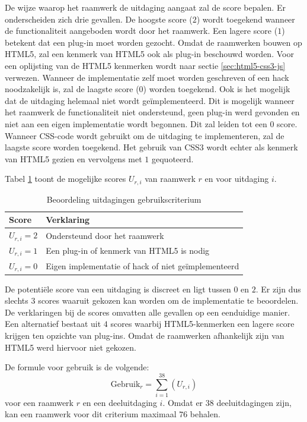 De wijze waarop het raamwerk de uitdaging aangaat zal de score bepalen.
Er onderscheiden zich drie gevallen.
De hoogste score ($2$) wordt toegekend wanneer de functionaliteit aangeboden wordt door het raamwerk. 
Een lagere score ($1$) betekent dat een plug-in moet worden gezocht.
Omdat de raamwerken bouwen op HTML5, zal een kenmerk van HTML5 ook als plug-in beschouwd worden.
Voor een oplijsting van de HTML5 kenmerken wordt naar sectie \ref{sec:html5-css3-js} verwezen.
Wanneer de implementatie zelf moet worden geschreven of een hack noodzakelijk is, zal de laagste score ($0$) worden toegekend.
Ook is het mogelijk  dat de uitdaging helemaal niet wordt geïmplementeerd.
Dit is mogelijk wanneer het raamwerk de functionaliteit niet ondersteund,  geen plug-in werd gevonden en niet aan een eigen implementatie wordt begonnen.
Dit zal leiden tot een $0$ score.
Wanneer CSS-code wordt gebruikt om de uitdaging te implementeren, zal de laagste score worden toegekend.
Het gebruik van CSS3 wordt echter als kenmerk van HTML5 gezien en vervolgens met $1$ gequoteerd.

Tabel \ref{tabel:scores-uitdagingen} toont de mogelijke scores $U_{r,i}$ van raamwerk $r$ en voor uitdaging $i$.
\begin{table}	
  \centering
  \begin{tabular}{ll}
    \toprule
    \textbf{Score} & \textbf{Verklaring}\\
    \midrule
    $U_{r,i} = 2$ & Ondersteund door het raamwerk\\
    $U_{r,i} = 1$ & Een plug-in of kenmerk van HTML5 is nodig\\
    $U_{r,i} = 0$ & Eigen implementatie of hack of niet geïmplementeerd\\ 
    \bottomrule
  \end{tabular}
  \caption{Beoordeling uitdagingen gebruikscriterium}
  \label{tabel:scores-uitdagingen}
\end{table}

De potentiële score van een uitdaging is discreet en ligt tussen $0$ en $2$.
Er zijn dus slechts $3$ scores waaruit gekozen kan worden om de implementatie te beoordelen.
De verklaringen bij de scores omvatten alle gevallen op een eenduidige manier.
Een alternatief bestaat uit $4$ scores waarbij HTML5-kenmerken een lagere score krijgen ten opzichte van plug-ins.
Omdat de raamwerken afhankelijk zijn van HTML5 werd hiervoor niet gekozen.

De formule voor gebruik is de volgende:
\begin{equation}
  \text{Gebruik}_r = \sum_{i=1}^{38}{\left(U_{r,i}\right)}
  \label{eq:gebruik}
\end{equation}
voor een raamwerk $r$ en een deeluitdaging $i$.
Omdat er $38$ deeluitdagingen zijn, kan een raamwerk voor dit criterium maximaal $76$ behalen.

